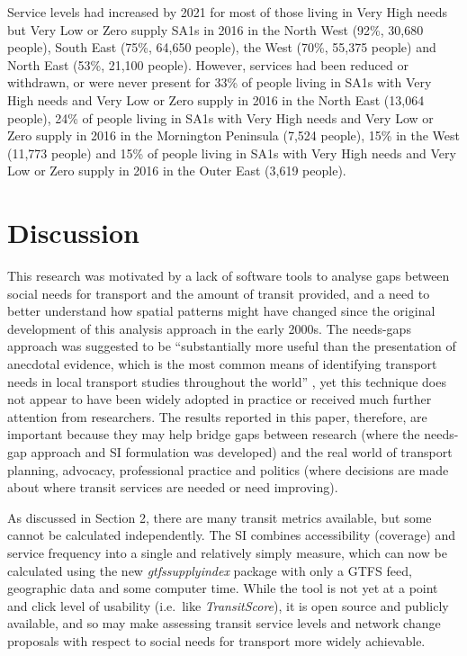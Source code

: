 \documentclass[preprint, 3p,
authoryear]{elsarticle} %
\begin{document}
Service levels had increased by 2021 for most of those living in Very
High needs but Very Low or Zero supply SA1s in 2016 in the North West
(92\%, 30,680 people), South East (75\%, 64,650 people), the West (70\%,
55,375 people) and North East (53\%, 21,100 people). However, services
had been reduced or withdrawn, or were never present for 33\% of people
living in SA1s with Very High needs and Very Low or Zero supply in 2016
in the North East (13,064 people), 24\% of people living in SA1s with
Very High needs and Very Low or Zero supply in 2016 in the Mornington
Peninsula (7,524 people), 15\% in the West (11,773 people) and 15\% of
people living in SA1s with Very High needs and Very Low or Zero supply
in 2016 in the Outer East (3,619 people).

\section{Discussion}\label{discussion}

This research was motivated by a lack of software tools to analyse gaps
between social needs for transport and the amount of transit provided,
and a need to better understand how spatial patterns might have changed
since the original development of this analysis approach in the early
2000s. The needs-gaps approach was suggested to be ``substantially more
useful than the presentation of anecdotal evidence, which is the most
common means of identifying transport needs in local transport studies
throughout the world'' \citep{currie2010identifying}, yet this technique
does not appear to have been widely adopted in practice or received much
further attention from researchers. The results reported in this paper,
therefore, are important because they may help bridge gaps between
research (where the needs-gap approach and SI formulation was developed)
and the real world of transport planning, advocacy, professional
practice and politics (where decisions are made about where transit
services are needed or need improving).

As discussed in Section 2, there are many transit metrics available, but
some cannot be calculated independently. The SI combines accessibility
(coverage) and service frequency into a single and relatively simply
measure, which can now be calculated using the new
\emph{gtfssupplyindex} package with only a GTFS feed, geographic data
and some computer time. While the tool is not yet at a point and click
level of usability (i.e.~like \emph{TransitScore}), it is open source
and publicly available, and so may make assessing transit service levels
and network change proposals with respect to social needs for transport
more widely achievable.
\end{document}
